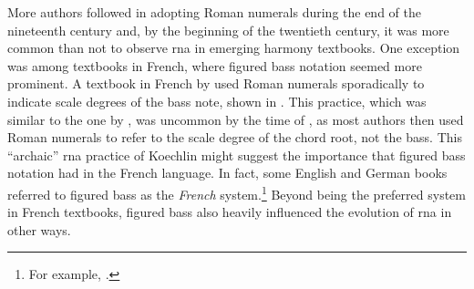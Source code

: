 

More authors followed in adopting Roman numerals during the
end of the nineteenth century and, by the beginning of the
twentieth century, it was more common than not to observe
\gls{rna} in emerging harmony textbooks. One exception was
among textbooks in French, where figured bass notation
seemed more prominent. A textbook in French by
\textcite{koechlin1928traite} used Roman numerals
sporadically to indicate scale degrees of the bass note,
shown in .
This practice, which was similar to the one by
\textcite{hamilton1840catechism}, was uncommon by the time
of \textcite{koechlin1928traite}, as most authors then used
Roman numerals to refer to the scale degree of the chord
root, not the bass. This ``archaic'' \gls{rna} practice of
Koechlin might suggest the importance that figured bass
notation had in the French language. In fact, some English
and German books referred to figured bass as the
\emph{French} system.\footnote{For example,
\textcite{norris1894practical}.} Beyond being the preferred
system in French textbooks, figured bass also heavily
influenced the evolution of \gls{rna} in other ways.

